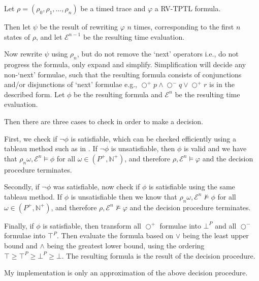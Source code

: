 \documentclass[a4paper]{article}
\newcommand{\sn}{\bigcirc^+}
\newcommand{\wn}{\bigcirc^-}
\newcommand{\eval}{\mathcal{E}}
\begin{document}
\begin{desc}[RV-TPTL]\label{decision}
  Let $\rho=(\rho_0,\rho_1,\dots,\rho_n)$ be a timed trace and $\varphi$ a RV-TPTL formula.

  Then let $\psi$ be the result of rewriting $\varphi$ $n$ times, corresponding to the first $n$ states of $\rho$, and let $\eval^{n-1}$ be the resulting time evaluation.

  Now rewrite $\psi$ using $\rho_n$, but do not remove the `next' operators i.e., do not progress the formula, only expand and simplify.
  Simplification will decide any non-`next' formulae, such that the resulting formula consists of conjunctions and/or disjunctions of `next' formulae e.g., $\sn p \land \wn q \lor \sn r$ is in the described form. Let $\phi$ be the resulting formula and $\eval^n$ be the resulting time evaluation.

  Then there are three cases to check in order to make a decision.

  First, we check if $\neg\phi$ is satisfiable, which can be checked efficiently using a tableau method such as in \textcite{alur1994really}. If $\neg\phi$ is unsatisfiable, then $\phi$ is valid and we have that $\rho_n\omega, \eval^n \vDash \phi$ for all $\omega\in (P^+,\mathbb{N}^+)$, and therefore $\rho,\eval^n \vDash \varphi$ and the decision procedure terminates.

  Secondly, if $\neg\phi$ was satisfiable, now check if $\phi$ is satisfiable using the same tableau method. If $\phi$ is unsatisfiable then we know that $\rho_n\omega, \eval^n \nvDash \phi$ for all $\omega\in (P^+,\mathbb{N}^+)$, and therefore $\rho,\eval^n \nvDash \varphi$ and the decision procedure terminates.

  Finally, if $\phi$ is satisfiable, then transform all $\sn$ formulae into $\bot^P$ and all $\wn$ formulae into $\top^P$. Then evaluate the formula based on $\lor$ being the least upper bound and $\land$ being the greatest lower bound, using the ordering $\top \geq \top^P \geq \bot^P \geq \bot$. The resulting formula is the result of the decision procedure.
\end{desc}

My implementation is only an approximation of the above decision procedure.
\end{document}
